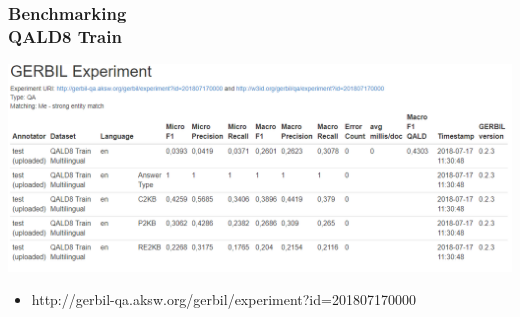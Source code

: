\documentclass{beamer}
\begin{document}
\begin{frame}
\frametitle{Benchmarking \\ {\normalsize QALD8 Train}}
\begin{center}
	\includegraphics[scale=0.38]{QALD-8-Train.PNG}
\end{center}

\begin{itemize}
	\item  http://gerbil-qa.aksw.org/gerbil/experiment?id=201807170000
\end{itemize}
\end{frame}
\end{document}
